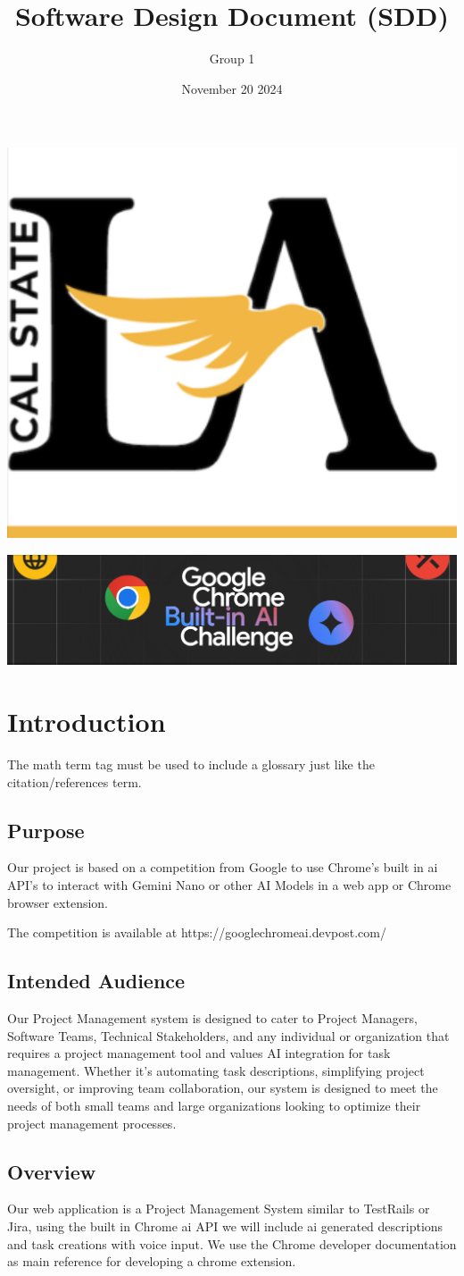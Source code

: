 \documentclass{article}
\title{Software Design Document (SDD)}
\author{Group 1 }
\date{November 20 2024}
\begin{document}
\maketitle  
\pagebreak

\tableofcontents
\pagebreak

\includegraphics[width=0.3\linewidth]{./logo/csula.png} 

\includegraphics[width=0.3\linewidth]{./logo/chromeai.png} 
\section{Introduction}
The \Gls{math} term tag must be used to include a glossary just like the citation/references \gls{term}. 
\subsection{Purpose}
Our project is based on a competition from Google to use Chrome's built in \Gls{ai} API's to interact with Gemini Nano or other AI Models in a web app or Chrome browser extension. 

The competition is available at https://googlechromeai.devpost.com/

\subsection{Intended Audience}
Our Project Management system is designed to cater to Project Managers, Software Teams, Technical Stakeholders, and any individual or organization that requires a project management tool and values AI integration for task management. Whether it's automating task descriptions, simplifying project oversight, or improving team collaboration, our system is designed to meet the needs of both small teams and large organizations looking to optimize their project management processes.


\subsection{Overview}
Our web application is a Project Management System similar to TestRails or Jira, using the built in Chrome \Gls{ai} API we will include ai generated descriptions and task creations with voice input. We use the Chrome developer documentation\cite{dev} as main reference for developing a chrome extension.
\end{document}
